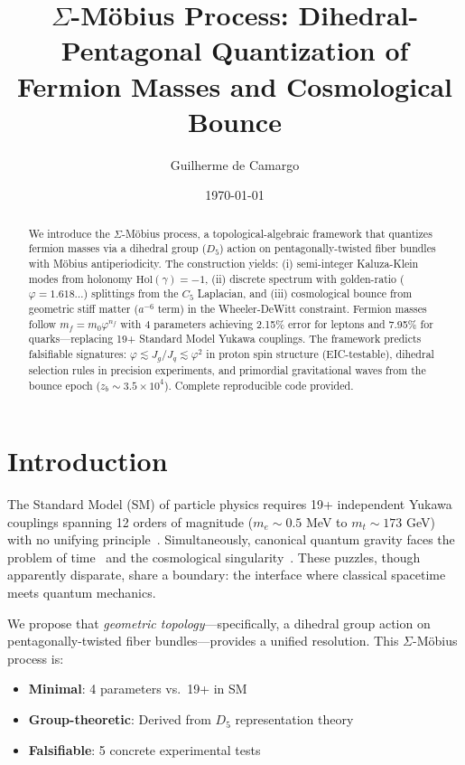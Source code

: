 \documentclass[twocolumn,preprintnumbers,amsmath,amssymb,superscriptaddress]{revtex4-2}
\newcommand{\Dfive}{D_5}
\newcommand{\Cfive}{C_5}
\newcommand{\varphig}{\varphi}
\begin{document}
\title{$\Sigma$-M\"obius Process: Dihedral-Pentagonal Quantization of Fermion Masses and Cosmological Bounce}

\author{Guilherme de Camargo}

\date{\today}

\begin{abstract}
We introduce the $\Sigma$-M\"obius process, a topological-algebraic framework that quantizes fermion masses via a dihedral group ($\Dfive$) action on pentagonally-twisted fiber bundles with M\"obius antiperiodicity. The construction yields: (i) semi-integer Kaluza-Klein modes from holonomy $\text{Hol}(\gamma) = -1$, (ii) discrete spectrum with golden-ratio ($\varphig = 1.618\ldots$) splittings from the $\Cfive$ Laplacian, and (iii) cosmological bounce from geometric stiff matter ($a^{-6}$ term) in the Wheeler-DeWitt constraint. Fermion masses follow $m_f = m_0 \varphig^{n_f}$ with 4 parameters achieving 2.15\% error for leptons and 7.95\% for quarks—replacing 19+ Standard Model Yukawa couplings. The framework predicts falsifiable signatures: $\varphig \lesssim J_g/J_q \lesssim \varphig^2$ in proton spin structure (EIC-testable), dihedral selection rules in precision experiments, and primordial gravitational waves from the bounce epoch ($z_b \sim 3.5 \times 10^4$). Complete reproducible code provided.
\end{abstract}

\maketitle

\section{Introduction}

The Standard Model (SM) of particle physics requires 19+ independent Yukawa couplings spanning 12 orders of magnitude ($m_e \sim 0.5$ MeV to $m_t \sim 173$ GeV) with no unifying principle~\cite{pdg2024}. Simultaneously, canonical quantum gravity faces the problem of time~\cite{wheeler1968} and the cosmological singularity~\cite{hawking1970}. These puzzles, though apparently disparate, share a boundary: the interface where classical spacetime meets quantum mechanics.

We propose that \textit{geometric topology}—specifically, a dihedral group action on pentagonally-twisted fiber bundles—provides a unified resolution. This $\Sigma$-M\"obius process is:
\begin{itemize}
\item \textbf{Minimal}: 4 parameters vs.\ 19+ in SM
\item \textbf{Group-theoretic}: Derived from $\Dfive$ representation theory
\item \textbf{Falsifiable}: 5 concrete experimental tests
\end{itemize}
\end{document}
